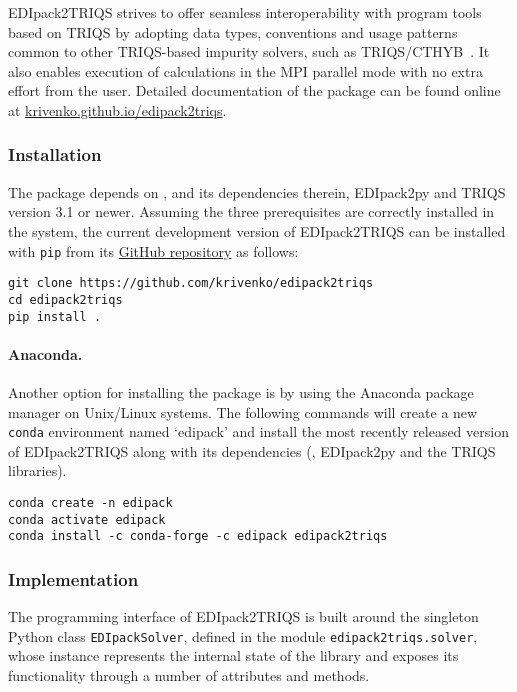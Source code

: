 \documentclass[edipack_sp.tex]{subfiles}
\begin{document}
EDIpack2TRIQS strives to offer seamless interoperability with program tools
based on TRIQS by adopting data types, conventions and usage patterns
common to other TRIQS-based impurity solvers, such as
TRIQS/CTHYB~\cite{Seth2016CPC}. It also enables execution of \NAME calculations
in the MPI parallel mode with no extra effort from the user.
Detailed documentation of the package can be 
found online at \href{https://krivenko.github.io/edipack2triqs/}
{krivenko.github.io/edipack2triqs}.

\subsubsection{Installation}\label{sSecInteropTRIQSInstallation}
The package depends on \NAME, and its dependencies therein, EDIpack2py
and TRIQS version 3.1 or newer. Assuming the three prerequisites are correctly 
installed in the system, the current development version of EDIpack2TRIQS can be 
installed with {\tt pip} from its 
\href{https://github.com/krivenko/edipack2triqs}{GitHub repository} as follows:

\begin{lstlisting}[style=mybash]
git clone https://github.com/krivenko/edipack2triqs
cd edipack2triqs
pip install .
\end{lstlisting}

\paragraph{Anaconda.}
Another option for installing the package is by using the Anaconda package 
manager on Unix/Linux systems.
The following commands will create a new {\tt conda} environment named 
`edipack' and install the most recently released version of EDIpack2TRIQS along 
with its dependencies (\NAME, EDIpack2py and the TRIQS libraries).

\begin{lstlisting}[style=mybash]
conda create -n edipack
conda activate edipack
conda install -c conda-forge -c edipack edipack2triqs
\end{lstlisting}

\subsubsection{Implementation}\label{sSecInteropTRIQSImplementation}
The programming interface of EDIpack2TRIQS is built around the  
singleton Python class {\tt EDIpackSolver}, defined in the module
{\tt edipack2triqs.solver}, whose instance represents the internal state of 
the \NAME library and exposes its functionality through a number of 
attributes and methods.
\end{document}

